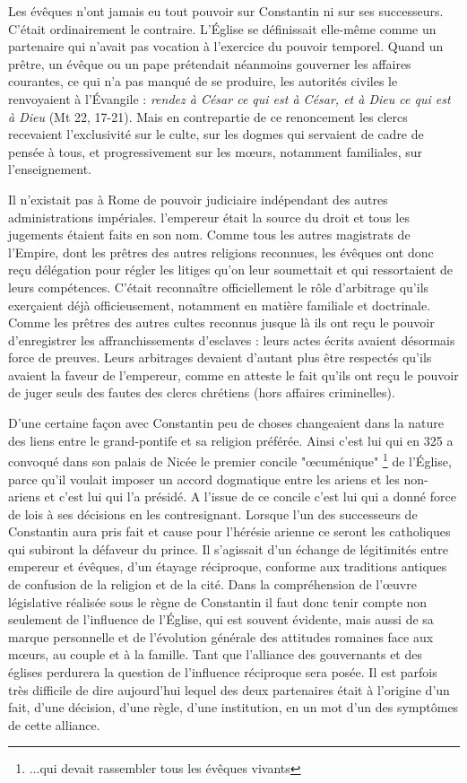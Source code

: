 Les évêques n'ont jamais eu tout pouvoir sur Constantin ni sur ses successeurs. C'était ordinairement le contraire. L'Église se définissait elle-même comme un partenaire qui n'avait pas vocation à l'exercice du pouvoir temporel. Quand un prêtre, un évêque ou un pape prétendait néanmoins gouverner les affaires courantes, ce qui n'a pas manqué de se produire, les autorités civiles le renvoyaient à l'Évangile : \emph{rendez à César ce qui est à César, et à Dieu ce qui est à Dieu} (Mt 22, 17-21). Mais en contrepartie de ce renoncement les clercs recevaient l'exclusivité sur le culte, sur les dogmes qui servaient de cadre de pensée à tous, et progressivement sur les mœurs, notamment familiales,  sur l'enseignement. 

 Il n'existait pas à Rome de pouvoir judiciaire indépendant des autres administrations impériales. l'empereur était la source du droit et tous les jugements étaient faits en son nom. Comme tous les autres magistrats de l'Empire, dont les prêtres des autres religions reconnues, les évêques ont donc reçu délégation pour régler les litiges qu'on leur soumettait et qui ressortaient de leurs compétences. C'était reconnaître officiellement le rôle d'arbitrage qu'ils exerçaient déjà officieusement, notamment en matière familiale et doctrinale. Comme les prêtres des autres cultes reconnus jusque là ils ont reçu le pouvoir d'enregistrer les affranchissements d'esclaves : leurs actes écrits avaient désormais force de preuves. Leurs arbitrages devaient d'autant plus être respectés qu'ils avaient la faveur de l'empereur, comme en atteste le fait qu'ils ont reçu le pouvoir de juger seuls des fautes des clercs chrétiens (hors affaires criminelles).
 
 

D'une certaine façon avec Constantin peu de choses changeaient dans la nature des liens entre le grand-pontife et sa religion préférée. Ainsi c'est lui qui en 325 a convoqué dans son palais de Nicée le premier concile "œcuménique"
\footnote{...qui devait rassembler tous les évêques vivants} 
de l'Église, parce qu'il voulait imposer un accord dogmatique entre les ariens et les non-ariens et c'est lui qui l'a présidé. A l'issue de ce concile c'est lui qui a donné force de lois à ses décisions en les contresignant. Lorsque l'un des successeurs de Constantin aura pris fait et cause pour l'hérésie arienne ce seront les catholiques qui subiront la défaveur du prince. Il s'agissait d'un échange de légitimités entre empereur et évêques, d'un étayage réciproque, conforme aux traditions antiques de confusion de la religion et de la cité. Dans la compréhension de l'œuvre législative réalisée sous le règne de Constantin il faut donc tenir compte non seulement de l'influence de l'Église, qui est souvent évidente, mais aussi de sa marque personnelle et de l'évolution générale des attitudes romaines face aux mœurs, au couple et à la famille. Tant que l'alliance des gouvernants et des églises perdurera la question de l'influence réciproque sera posée. Il est parfois très difficile de dire aujourd'hui lequel des deux partenaires était à l'origine d'un fait, d'une décision, d'une règle, d'une institution, en un mot d'un des symptômes de cette alliance. 

